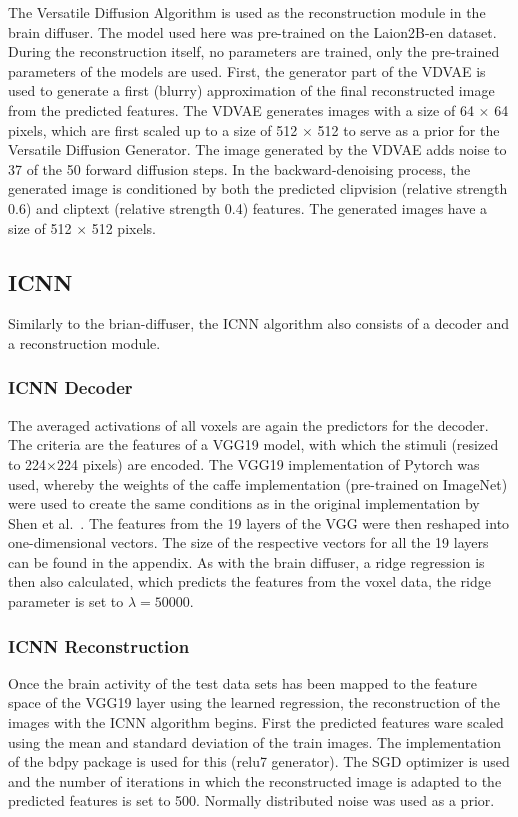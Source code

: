 The Versatile Diffusion Algorithm\cite{xuVersatileDiffusionText2024} is used as the reconstruction module in the brain diffuser. The model used here was pre-trained on the Laion2B-en\cite{schuhmannLAION400MOpenDataset2021} dataset. During the reconstruction itself, no parameters are trained, only the pre-trained parameters of the models are used. First, the generator part of the VDVAE is used to generate a first (blurry) approximation of the final reconstructed image from the predicted features. The VDVAE generates images with a size of 64 $\times$ 64 pixels, which are first scaled up to a size of 512 $\times$ 512 to serve as a prior for the Versatile Diffusion Generator. The image generated by the VDVAE adds noise to 37 of the 50 forward diffusion steps. In the backward-denoising process, the generated image is conditioned by both the predicted clipvision (relative strength 0.6) and cliptext (relative strength 0.4) features. The generated images have a size of 512 $\times$ 512 pixels. 

\subsection{ICNN}
Similarly to the brian-diffuser, the ICNN\cite{shenDeepImageReconstruction2019} algorithm also consists of a decoder and a reconstruction module. 
\subsubsection{ICNN Decoder}
The averaged activations of all voxels are again the predictors for the decoder. The criteria are the features of a VGG19\cite{simonyanVeryDeepConvolutional2014} model, with which the stimuli (resized to 224$\times$224 pixels) are encoded. The VGG19 implementation of Pytorch was used, whereby the weights of the caffe implementation\cite{ModelZoo} (pre-trained on ImageNet) were used to create the same conditions as in the original implementation by Shen et al.\ \cite{shenDeepImageReconstruction2019}. The features from the 19 layers of the VGG were then reshaped into one-dimensional vectors. The size of the respective vectors for all the 19 layers can be found in the appendix. As with the brain diffuser, a ridge regression is then also calculated, which predicts the features from the voxel data, the ridge parameter is set to $\lambda=50000$.

\subsubsection{ICNN Reconstruction}
Once the brain activity of the test data sets has been mapped to the feature space of the VGG19 layer using the learned regression, the reconstruction of the images with the ICNN algorithm\cite{shenDeepImageReconstruction2019} begins. First the predicted features ware scaled using the mean and standard deviation of the train images. The implementation of the bdpy package\cite{KamitaniLabBdpy2024} is used for this (relu7 generator). The SGD optimizer is used and the number of iterations in which the reconstructed image is adapted to the predicted features is set to 500. Normally distributed noise was used as a prior.

